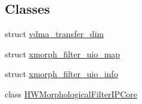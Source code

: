 \subsection*{Classes}
\begin{DoxyCompactItemize}
\item 
struct \hyperlink{structvdma__transfer__dim}{vdma\+\_\+transfer\+\_\+dim}
\item 
struct \hyperlink{structxmorph__filter__uio__map}{xmorph\+\_\+filter\+\_\+uio\+\_\+map}
\item 
struct \hyperlink{structxmorph__filter__uio__info}{xmorph\+\_\+filter\+\_\+uio\+\_\+info}
\item 
class \hyperlink{classHWMorphologicalFilterIPCore}{H\+W\+Morphological\+Filter\+I\+P\+Core}
\end{DoxyCompactItemize}
